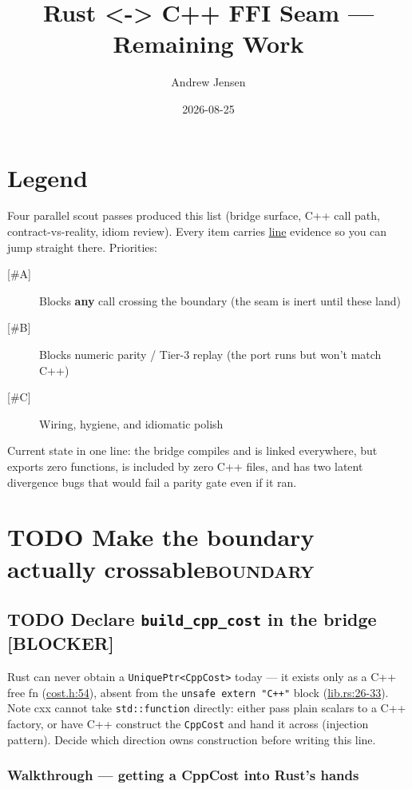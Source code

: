 \documentclass[11pt]{article}
\author{Andrew Jensen}
\date{2026-08-25}
\title{Rust <-> C++ FFI Seam — Remaining Work}
\begin{document}
\maketitle

\section{Legend}
\label{sec:orga5da1a0}
Four parallel scout passes produced this list (bridge surface, C++ call
path, contract-vs-reality, idiom review). Every item carries \url{line}
evidence so you can jump straight there. Priorities:

\begin{description}
\item[{{[}\#A]}] Blocks \textbf{any} call crossing the boundary (the seam is inert until these land)
\item[{{[}\#B]}] Blocks numeric parity / Tier-3 replay (the port runs but won't match C++)
\item[{{[}\#C]}] Wiring, hygiene, and idiomatic polish
\end{description}

Current state in one line: the bridge compiles and is linked everywhere,
but exports zero functions, is included by zero C++ files, and has two
latent divergence bugs that would fail a parity gate even if it ran.
\section{{\bfseries\sffamily TODO} Make the boundary actually crossable\hfill{}\textsc{boundary}}
\label{sec:orgc82474b}

\subsection{{\bfseries\sffamily TODO} Declare \texttt{build\_cpp\_cost} in the bridge [BLOCKER]}
\label{sec:org04edb14}
Rust can never obtain a \texttt{UniquePtr<CppCost>} today — it exists only as a
C++ free fn (\href{include/domain/cost.h}{cost.h:54}), absent from the \texttt{unsafe extern "C++"}
block (\href{rust/direct-rs/src/lib.rs}{lib.rs:26-33}). Note cxx cannot take \texttt{std::function} directly:
either pass plain scalars to a C++ factory, or have C++ construct the
\texttt{CppCost} and hand it across (injection pattern). Decide which direction
owns construction before writing this line.
\subsubsection{Walkthrough — getting a CppCost into Rust's hands}
\label{sec:orge6e6bc8}
\end{document}
